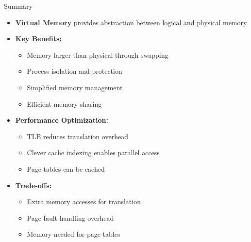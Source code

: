 \documentclass[aspectratio=169,12pt]{beamer}
\begin{document}
\begin{frame}{Summary}
\begin{itemize}
\item \textbf{Virtual Memory} provides abstraction between logical and physical memory
\item \textbf{Key Benefits:}
\begin{itemize}
  \item Memory larger than physical through swapping
  \item Process isolation and protection
  \item Simplified memory management
  \item Efficient memory sharing
\end{itemize}
\item \textbf{Performance Optimization:}
\begin{itemize}
  \item TLB reduces translation overhead
  \item Clever cache indexing enables parallel access
  \item Page tables can be cached
\end{itemize}
\item \textbf{Trade-offs:}
\begin{itemize}
  \item Extra memory accesses for translation
  \item Page fault handling overhead
  \item Memory needed for page tables
\end{itemize}
\end{itemize}
\end{frame}
\end{document}
